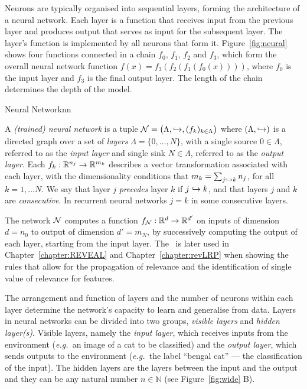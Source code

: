 Neurons are typically organised into sequential layers, forming the architecture of a neural network. Each layer is a function that receives input from the previous layer and produces output that serves as input for the subsequent layer. The layer's function is implemented by all neurons that form it. Figure~\ref{fig:neural} shows four functions connected in a chain $f_{0}$, $f_{1}$, $f_{2}$ and $f_{3}$, which form the overall neural network function $f(x) = f_{3}(f_{2}(f_{1}(f_{0}(x))))$, where $f_{0}$ is the input layer and $f_{3}$ is the final output layer. The length of the chain determines the depth of the model. 

\begin{Definition}{Neural Network}{nn}

A \emph{(trained) neural network} is a tuple $\mathcal{N}=\big(\Lambda,\hookrightarrow,(f_k)_{k\in \Lambda}\big)$ where $(\Lambda,\hookrightarrow)$ is a directed graph over a set of \emph{layers} $\Lambda=\{0,\dots, N\}$, with a single source $0\in \Lambda$, referred to as the \emph{input layer} and single sink $N\in \Lambda$, referred to as the \emph{output layer}. Each $f_k:\mathbb{R}^{n_j}\to \mathbb{R}^{m_k}$ describes a vector transformation associated with each layer, with the dimensionality conditions that $m_k=\sum_{j\hookrightarrow k} n_j$, for all $k=1,\dots N$.
%
We say that layer $j$ \emph{precedes} layer $k$ if $j\hookrightarrow k$, and that layers $j$ and $k$ are \emph{consecutive}. In recurrent neural networks $j = k$ in some consecutive layers. 
\end{Definition}

The network $\mathcal{N}$ computes a function $f_{\mathcal{N}}:\mathbb{R}^{d}\to \mathbb{R}^{d'}$ on inputs of dimension $d=n_0$ to output of dimension $d'=m_N$, by successively computing the output of each layer, starting from the input layer. The~ is later used in Chapter~\ref{chapter:REVEAL} and Chapter~\ref{chapter:revLRP} when showing the rules that allow for the propagation of relevance and the identification of single value of relevance for features.

The arrangement and function of layers and the number of neurons within each layer determine the network's capacity to learn and generalise from data. Layers in neural networks can be divided into two groups, \textit{visible layers} and \textit{hidden layer(s)}. Visible layers, namely the \textit{input layer}, which receives inputs from the environment (\textit{e.g.\ }an image of a cat to be classified) and the \textit{output layer}, which sends outputs to the environment (\textit{e.g.\ }the label ``bengal cat'' --- the classification of the input). The hidden layers are the layers between the input and the output and they can be any natural number $n \in \mathbb{N}$ (see Figure~\ref{fig:wide} B). 

